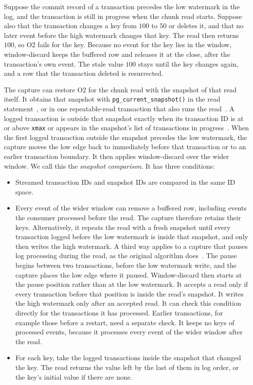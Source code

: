 \documentclass[sigconf,nonacm,10pt]{acmart}
\theoremstyle{plain}
\theoremstyle{definition}
\begin{document}
Suppose the commit record of a transaction precedes the low watermark in the
log, and the transaction is still in progress when the chunk read starts.
Suppose also that the transaction changes a key from $100$ to $50$ or deletes
it, and that no later event before the high watermark changes that key. The
read then returns $100$, so O2 fails for the key. Because no event for the key
lies in the window, window-discard keeps the buffered row and releases it at
the close, after the transaction's own event. The stale value $100$ stays until
the key changes again, and a row that the transaction deleted is resurrected.

The capture can restore O2 for the chunk read with the snapshot of that read
itself. It obtains that snapshot with
\texttt{pg\_\allowbreak{}current\_\allowbreak{}snapshot()} in the read
statement~\cite{postgres_commit_source}, or in one repeatable-read
transaction that also runs the read~\cite{postgres_transaction_iso}. A
logged transaction is outside that snapshot exactly when its transaction
ID is at or above \texttt{xmax} or appears in the snapshot's list of transactions in
progress~\cite{postgres_snapshot_functions}. When the first logged
transaction outside the snapshot precedes the low watermark, the capture
moves the low edge back to immediately before that transaction or to an
earlier transaction boundary. It then applies window-discard over the wider
window. We call this the
\emph{snapshot comparison}. It has three conditions:

\begin{itemize}
\item Streamed transaction IDs and snapshot IDs are compared in the same
ID space.
\item Every event of the wider window can remove a buffered row, including
events the consumer processed before the read. The capture therefore
retains their keys. Alternatively, it repeats the read with a fresh
snapshot until every transaction logged before the low watermark is inside
that snapshot, and only then writes the high watermark. A third way
applies to a capture that pauses log processing during the read, as the
original algorithm does~\cite{andreakis2020dblog}. The pause begins between
two transactions, before the low watermark write, and the capture places the
low edge where it paused. Window-discard then starts at the pause position
rather than at the low watermark. It accepts a read only if every transaction
before that position is inside the read's snapshot. It writes the high
watermark only after an accepted read. It can check this condition directly
for the transactions it has processed. Earlier transactions, for example
those before a restart, need a separate check. It keeps no keys of processed
events, because it processes every event of the wider window after the read.
\item For each key, take the logged transactions inside the snapshot that
changed the key. The read returns the value left by the last of them in log
order, or the key's initial value if there are none.
\end{itemize}
\end{document}
